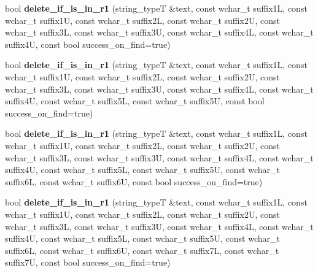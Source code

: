 \begin{DoxyCompactItemize}
\item 
\hypertarget{group___stemming_ga6be1595a7c29fec666ff808701be3eb2}{bool {\bfseries delete\-\_\-if\-\_\-is\-\_\-in\-\_\-r1} (string\-\_\-type\-T \&text, const wchar\-\_\-t suffix1\-L, const wchar\-\_\-t suffix1\-U, const wchar\-\_\-t suffix2\-L, const wchar\-\_\-t suffix2\-U, const wchar\-\_\-t suffix3\-L, const wchar\-\_\-t suffix3\-U, const wchar\-\_\-t suffix4\-L, const wchar\-\_\-t suffix4\-U, const bool success\-\_\-on\-\_\-find=true)}\label{group___stemming_ga6be1595a7c29fec666ff808701be3eb2}

\item 
\hypertarget{group___stemming_gabac9ef13a80efee3dad9b72476f7cd49}{bool {\bfseries delete\-\_\-if\-\_\-is\-\_\-in\-\_\-r1} (string\-\_\-type\-T \&text, const wchar\-\_\-t suffix1\-L, const wchar\-\_\-t suffix1\-U, const wchar\-\_\-t suffix2\-L, const wchar\-\_\-t suffix2\-U, const wchar\-\_\-t suffix3\-L, const wchar\-\_\-t suffix3\-U, const wchar\-\_\-t suffix4\-L, const wchar\-\_\-t suffix4\-U, const wchar\-\_\-t suffix5\-L, const wchar\-\_\-t suffix5\-U, const bool success\-\_\-on\-\_\-find=true)}\label{group___stemming_gabac9ef13a80efee3dad9b72476f7cd49}

\item 
\hypertarget{group___stemming_ga3fbbd1cbf322889ba4e4940d87449bb0}{bool {\bfseries delete\-\_\-if\-\_\-is\-\_\-in\-\_\-r1} (string\-\_\-type\-T \&text, const wchar\-\_\-t suffix1\-L, const wchar\-\_\-t suffix1\-U, const wchar\-\_\-t suffix2\-L, const wchar\-\_\-t suffix2\-U, const wchar\-\_\-t suffix3\-L, const wchar\-\_\-t suffix3\-U, const wchar\-\_\-t suffix4\-L, const wchar\-\_\-t suffix4\-U, const wchar\-\_\-t suffix5\-L, const wchar\-\_\-t suffix5\-U, const wchar\-\_\-t suffix6\-L, const wchar\-\_\-t suffix6\-U, const bool success\-\_\-on\-\_\-find=true)}\label{group___stemming_ga3fbbd1cbf322889ba4e4940d87449bb0}

\item 
\hypertarget{group___stemming_gacdf0457bd3392f1ac23dadef5515cebd}{bool {\bfseries delete\-\_\-if\-\_\-is\-\_\-in\-\_\-r1} (string\-\_\-type\-T \&text, const wchar\-\_\-t suffix1\-L, const wchar\-\_\-t suffix1\-U, const wchar\-\_\-t suffix2\-L, const wchar\-\_\-t suffix2\-U, const wchar\-\_\-t suffix3\-L, const wchar\-\_\-t suffix3\-U, const wchar\-\_\-t suffix4\-L, const wchar\-\_\-t suffix4\-U, const wchar\-\_\-t suffix5\-L, const wchar\-\_\-t suffix5\-U, const wchar\-\_\-t suffix6\-L, const wchar\-\_\-t suffix6\-U, const wchar\-\_\-t suffix7\-L, const wchar\-\_\-t suffix7\-U, const bool success\-\_\-on\-\_\-find=true)}\label{group___stemming_gacdf0457bd3392f1ac23dadef5515cebd}


\end{DoxyCompactItemize}
